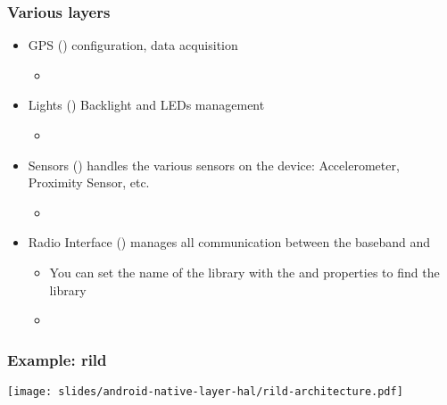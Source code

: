 \begin{frame}
  \frametitle{Various layers}
  \begin{itemize}
  \item GPS () configuration, data acquisition
    \begin{itemize}
    \item {}
    \end{itemize}
  \item Lights () Backlight and LEDs management
    \begin{itemize}
    \item {}
    \end{itemize}
  \item Sensors () handles the various sensors on
    the device: Accelerometer, Proximity Sensor, etc.
    \begin{itemize}
    \item {}
    \end{itemize}
  \item Radio Interface () manages all
    communication between the baseband and 
    \begin{itemize}
    \item You can set the name of the library with the  and
       properties to find the library
    \item {}
    \end{itemize}
  \end{itemize}
\end{frame}

\begin{frame}
  \frametitle{Example: rild}
  \begin{center}
    \texttt{[image: slides/android-native-layer-hal/rild-architecture.pdf]}
  \end{center}
\end{frame}
